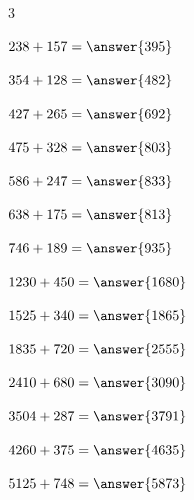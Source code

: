\documentclass{ximera}
\begin{document}
\begin{oefening}{\oefB\ESS}
\begin{multicols}{3}
    \begin{question} \(238+157=\answer{395}\) \end{question}
    
    \begin{question} \(354+128=\answer{482}\) \end{question}
    
    \begin{question} \(427+265=\answer{692}\) \end{question}
    
    \begin{question} \(475+328=\answer{803}\) \end{question}
    
    \begin{question} \(586+247=\answer{833}\) \end{question}
    
    \begin{question} \(638+175=\answer{813}\) \end{question}
    
    \begin{question} \(746+189=\answer{935}\) \end{question}
    
    \begin{question} \(1230+450=\answer{1680}\) \end{question}
    
    \begin{question} \(1525+340=\answer{1865}\) \end{question}
    
    \begin{question} \(1835+720=\answer{2555}\) \end{question}
    
    \begin{question} \(2410+680=\answer{3090}\) \end{question}
    
    \begin{question} \(3504+287=\answer{3791}\) \end{question}
    
    \begin{question} \(4260+375=\answer{4635}\) \end{question}
    
    \begin{question} \(5125+748=\answer{5873}\) \end{question}
    

\end{multicols}
\end{oefening}
\end{document}
